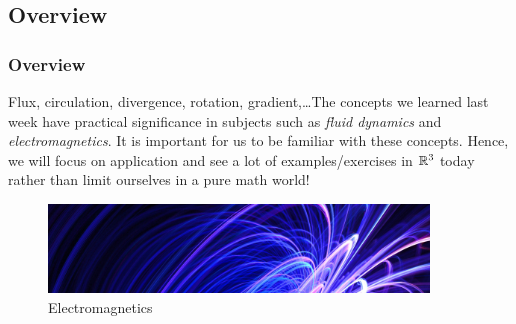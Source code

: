 \documentclass[11pt, t]{beamer}
\renewcommand{\emph}[1]{{\color{Turquoise3}\textsl{#1}}}
\begin{document}
\subsection{Overview}
\begin{frame}
    \frametitle{Overview}
    Flux, circulation, divergence, rotation, gradient,\dots The concepts we learned last week have practical significance in subjects such as \emph{fluid dynamics} and \emph{electromagnetics}. It is important for us to be familiar with these concepts. Hence, we will focus on application and see a lot of examples/exercises in $\mathbb{R}^3$ today rather than limit ourselves in a pure math world!
    \vspace{1cm}
    \begin{figure}[H]
    \centering
    \includegraphics[width=0.9\textwidth]{2020-07-22-15-16-33.png}
    \caption{Electromagnetics}
    \end{figure}
    
\end{frame}
\end{document}
